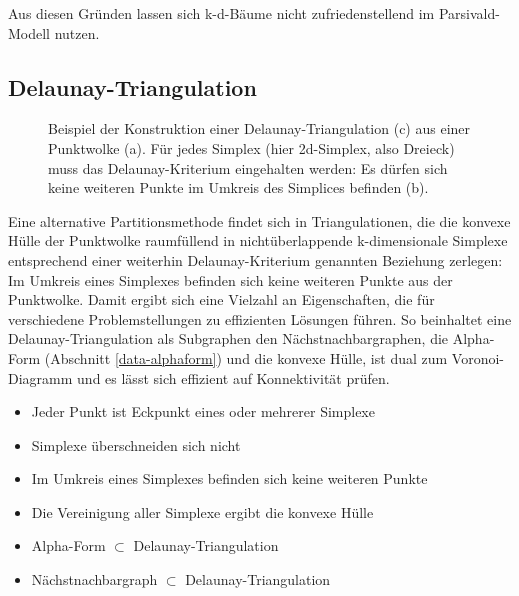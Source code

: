 Aus diesen Gründen lassen sich k-d-Bäume nicht zufriedenstellend im Parsivald-Modell nutzen.

\subsection{Delaunay-Triangulation}\label{datadelaunay}

\begin{figure}[bhpt]
  \centering
  \def\svgwidth{\textwidth}
  
  \caption[Delaunay-Triangulation]{Beispiel der Konstruktion einer Delaunay-Triangulation (c) aus einer Punktwolke (a).
    Für jedes Simplex (hier 2d-Simplex, also Dreieck) muss das Delaunay-Kriterium eingehalten werden:
    Es dürfen sich keine weiteren Punkte im Umkreis des Simplices befinden (b).
  }
  \label{fig:delaunay}
\end{figure}

Eine alternative Partitionsmethode findet sich in Triangulationen, die die konvexe Hülle der Punktwolke raumfüllend in nichtüberlappende k-dimensionale Simplexe entsprechend einer weiterhin Delaunay-Kriterium genannten Beziehung zerlegen:
Im Umkreis eines Simplexes befinden sich keine weiteren Punkte aus der Punktwolke.
Damit ergibt sich eine Vielzahl an Eigenschaften, die für verschiedene Problemstellungen zu effizienten Lösungen führen.
So beinhaltet eine Delaunay-Triangulation als Subgraphen den Nächstnachbargraphen, die Alpha-Form (Abschnitt \ref{data-alphaform}) und die konvexe Hülle, ist dual zum Voronoi-Diagramm und es lässt sich effizient auf Konnektivität prüfen.

\begin{itemize}
\item Jeder Punkt ist Eckpunkt eines oder mehrerer Simplexe
\item Simplexe überschneiden sich nicht
\item Im Umkreis eines Simplexes befinden sich keine weiteren Punkte
\item Die Vereinigung aller Simplexe ergibt die konvexe Hülle
\item Alpha-Form $\subset$ Delaunay-Triangulation
\item %
  Nächstnachbargraph $\subset$ Delaunay-Triangulation
\end{itemize}

